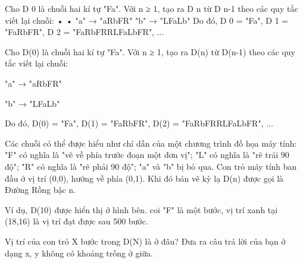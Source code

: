 Cho D 0 là chuỗi hai kí tự "Fa". Với n ≥ 1, tạo ra D n từ D n-1 theo các quy tắc viết lại chuỗi:       •       •       "a" → "aRbFR"       "b" → "LFaLb"       Do đó, D 0 = "Fa", D 1 = "FaRbFR", D 2 = "FaRbFRRLFaLbFR", ...    

   Cho D(0) là chuỗi hai kí tự "Fa". Với n ≥ 1, tạo ra D(n) từ D(n-1) theo các quy tắc viết lại chuỗi:  

   "a" → "aRbFR"  

   "b" → "LFaLb"  

   Do đó, D(0) = "Fa", D(1) = "FaRbFR", D(2) = "FaRbFRRLFaLbFR", ...  

   Các chuỗi có thể được hiểu như chỉ dẫn của một chương trình đồ họa máy tính: "F" có nghĩa là "vẽ về phía trước đoạn một đơn vị"; "L" có nghĩa là "rẽ trái 90 độ"; "R" có nghĩa là "rẽ phải 90 độ"; "a" và "b" bị bỏ qua. Con trỏ máy tính ban đầu ở vị trí (0,0), hướng về phía (0,1). Khi đó bản vẽ kỳ lạ D(n) được gọi là Đường Rồng bậc n.  

   Ví dụ, D(10) được hiển thị ở hình bên. coi "F" là một bước, vị trí xanh tại (18,16) là vị trí đạt được sau 500 bước.  

   Vị trí của con trỏ X bước trong D(N) là ở đâu? Đưa ra câu trả lời của bạn ở dạng x, y không có khoảng trống ở giữa.  



\